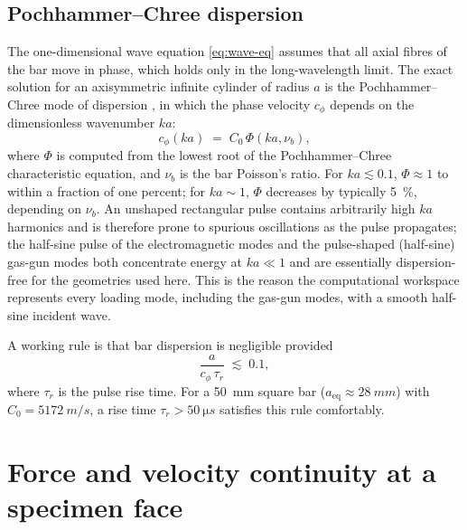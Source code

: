 \documentclass[11pt,a4paper,openany]{book}
\providecommand{\SI}[2]{\qty{#1}{#2}}
\theoremstyle{handbook}
\newcommand{\Cz}{C_0}
\begin{document}
\subsection{Pochhammer--Chree dispersion}\label{sec:dispersion}

The one-dimensional wave equation \eqref{eq:wave-eq} assumes that all axial
fibres of the bar move in phase, which holds only in the long-wavelength
limit. The exact solution for an axisymmetric infinite cylinder of radius
$a$ is the Pochhammer--Chree mode of dispersion \cite{Davies1948,GrahamPC},
in which the phase velocity $c_\phi$ depends on the dimensionless wavenumber
$ka$:
\begin{equation}
  c_\phi(ka) \;=\; \Cz\,\Phi(ka,\nu_b),
\end{equation}
where $\Phi$ is computed from the lowest root of the Pochhammer--Chree
characteristic equation, and $\nu_b$ is the bar Poisson's ratio. For
$ka \lesssim 0.1$, $\Phi \approx 1$ to within a fraction of one percent; for
$ka \sim 1$, $\Phi$ decreases by typically \SI{5}{\percent}, depending on
$\nu_b$. An unshaped rectangular pulse contains arbitrarily high $ka$
harmonics and is therefore prone to spurious oscillations as the pulse
propagates; the half-sine pulse of the electromagnetic modes and the
pulse-shaped (half-sine) gas-gun modes both concentrate energy at
$ka \ll 1$ and are essentially dispersion-free for the geometries used here.
This is the reason the computational workspace represents every loading mode, including
the gas-gun modes, with a smooth half-sine incident wave.

A working rule is that bar dispersion is negligible provided
\begin{equation}
  \frac{a}{c_\phi\,\tau_r} \;\lesssim\; 0.1,
  \label{eq:dispersion-rule}
\end{equation}
where $\tau_r$ is the pulse rise time. For a \SI{50}{mm} square bar
($a_{\text{eq}} \approx \SI{28}{mm}$) with $\Cz = \SI{5172}{m/s}$, a rise
time $\tau_r > \SI{50}{\micro s}$ satisfies this rule comfortably.

\section{Force and velocity continuity at a specimen face}
\end{document}
